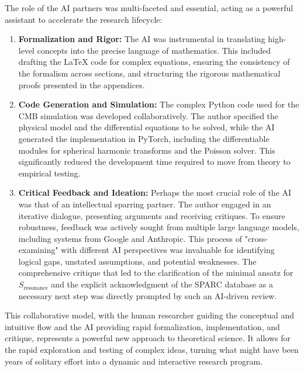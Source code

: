 \documentclass[12pt, a4paper]{article}
\begin{document}
The role of the AI partners was multi-faceted and essential, acting as a powerful assistant to accelerate the research lifecycle:
\begin{enumerate}
    \item \textbf{Formalization and Rigor:} The AI was instrumental in translating high-level concepts into the precise language of mathematics. This included drafting the LaTeX code for complex equations, ensuring the consistency of the formalism across sections, and structuring the rigorous mathematical proofs presented in the appendices.
    
    \item \textbf{Code Generation and Simulation:} The complex Python code used for the CMB simulation was developed collaboratively. The author specified the physical model and the differential equations to be solved, while the AI generated the implementation in PyTorch, including the differentiable modules for spherical harmonic transforms and the Poisson solver. This significantly reduced the development time required to move from theory to empirical testing.
    
    \item \textbf{Critical Feedback and Ideation:} Perhaps the most crucial role of the AI was that of an intellectual sparring partner. The author engaged in an iterative dialogue, presenting arguments and receiving critiques. To ensure robustness, feedback was actively sought from multiple large language models, including systems from Google and Anthropic. This process of "cross-examining" with different AI perspectives was invaluable for identifying logical gaps, unstated assumptions, and potential weaknesses. The comprehensive critique that led to the clarification of the minimal ansatz for \(S_{\mathrm{resonance}}\) and the explicit acknowledgment of the SPARC database as a necessary next step was directly prompted by such an AI-driven review.
\end{enumerate}

This collaborative model, with the human researcher guiding the conceptual and intuitive flow and the AI providing rapid formalization, implementation, and critique, represents a powerful new approach to theoretical science. It allows for the rapid exploration and testing of complex ideas, turning what might have been years of solitary effort into a dynamic and interactive research program.
\end{document}
